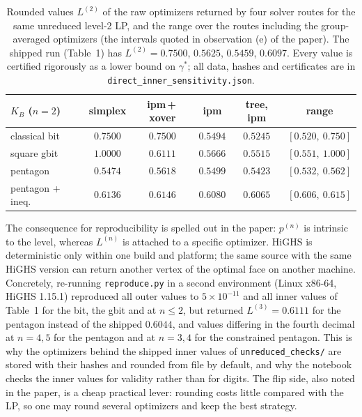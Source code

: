 \documentclass[11pt,a4paper]{article}
\newcommand*{\code}[1]{\texttt{#1}}
\theoremstyle{remark}
\begin{document}
\begin{table}[ht]\centering\small
\begin{tabular}{lcccc@{\qquad}c}
\toprule
$K_B$ ($n=2$) & simplex & ipm\,+\,xover & ipm & tree, ipm & range\\
\midrule
classical bit & $0.7500$ & $0.7500$ & $0.5494$ & $0.5245$ & $[0.520,\ 0.750]$\\
square gbit & $1.0000$ & $0.6111$ & $0.5666$ & $0.5515$ & $[0.551,\ 1.000]$\\
pentagon & $0.5474$ & $0.5618$ & $0.5499$ & $0.5423$ & $[0.532,\ 0.562]$\\
pentagon + ineq. & $0.6136$ & $0.6146$ & $0.6080$ & $0.6065$ & $[0.606,\ 0.615]$\\
\bottomrule
\end{tabular}
\caption{Rounded values $L^{(2)}$ of the raw optimizers returned by four
solver routes for the same unreduced level-2 LP, and the range over the
routes including the group-averaged optimizers (the intervals quoted in
observation (e) of the paper). The shipped run (Table~1) has
$L^{(2)}=0.7500$, $0.5625$, $0.5459$, $0.6097$. Every value is certified
rigorously as a lower bound on $\gamma^*$; all data, hashes and certificates
are in \code{direct\_inner\_sensitivity.json}.}
\label{tab:sens}
\end{table}

The consequence for reproducibility is spelled out in the paper: $p^{(n)}$
is intrinsic to the level, whereas $L^{(n)}$ is attached to a specific
optimizer. HiGHS is deterministic only within one build and platform; the
same source with the same HiGHS version can return another vertex of the
optimal face on another machine. Concretely, re-running \code{reproduce.py} in a second environment
(Linux x86-64, HiGHS 1.15.1) reproduced all outer values to $5\times
10^{-11}$ and all inner values of Table~1 for the bit, the gbit and at
$n\leq 2$, but returned $L^{(3)}=0.6111$ for the pentagon instead of the
shipped $0.6044$, and values differing in the fourth decimal at $n=4,5$
for the pentagon and at $n=3,4$ for the constrained pentagon. This is why the optimizers behind the shipped inner
values of \code{unreduced\_checks/} are stored with their hashes and
rounded from file by default, and why the notebook checks the inner values
for validity rather than for digits. The flip side, also noted in the
paper, is a cheap practical lever: rounding costs little compared with the
LP, so one may round several optimizers and keep the best strategy.

\end{document}
